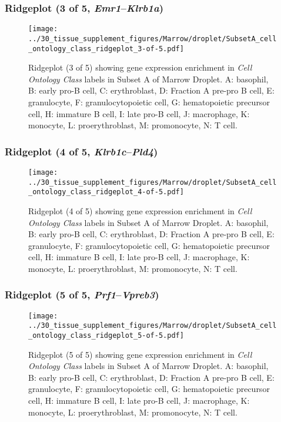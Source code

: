 \clearpage

\subsubsection{Ridgeplot (3 of 5, \emph{Emr1}--\emph{Klrb1a})}
\begin{figure}[h]
\centering
\texttt{[image: ../30\_tissue\_supplement\_figures/Marrow/droplet/SubsetA\_cell\_ontology\_class\_ridgeplot\_3-of-5.pdf]}

\caption{ Ridgeplot (3 of 5)  showing gene expression enrichment in \emph{Cell Ontology Class} labels in Subset A of Marrow Droplet. A: basophil, B: early pro-B cell, C: erythroblast, D: Fraction A pre-pro B cell, E: granulocyte, F: granulocytopoietic cell, G: hematopoietic precursor cell, H: immature B cell, I: late pro-B cell, J: macrophage, K: monocyte, L: proerythroblast, M: promonocyte, N: T cell.}
\end{figure}


\clearpage

\subsubsection{Ridgeplot (4 of 5, \emph{Klrb1c}--\emph{Pld4})}
\begin{figure}[h]
\centering
\texttt{[image: ../30\_tissue\_supplement\_figures/Marrow/droplet/SubsetA\_cell\_ontology\_class\_ridgeplot\_4-of-5.pdf]}

\caption{ Ridgeplot (4 of 5)  showing gene expression enrichment in \emph{Cell Ontology Class} labels in Subset A of Marrow Droplet. A: basophil, B: early pro-B cell, C: erythroblast, D: Fraction A pre-pro B cell, E: granulocyte, F: granulocytopoietic cell, G: hematopoietic precursor cell, H: immature B cell, I: late pro-B cell, J: macrophage, K: monocyte, L: proerythroblast, M: promonocyte, N: T cell.}
\end{figure}


\clearpage

\subsubsection{Ridgeplot (5 of 5, \emph{Prf1}--\emph{Vpreb3})}
\begin{figure}[h]
\centering
\texttt{[image: ../30\_tissue\_supplement\_figures/Marrow/droplet/SubsetA\_cell\_ontology\_class\_ridgeplot\_5-of-5.pdf]}

\caption{ Ridgeplot (5 of 5)  showing gene expression enrichment in \emph{Cell Ontology Class} labels in Subset A of Marrow Droplet. A: basophil, B: early pro-B cell, C: erythroblast, D: Fraction A pre-pro B cell, E: granulocyte, F: granulocytopoietic cell, G: hematopoietic precursor cell, H: immature B cell, I: late pro-B cell, J: macrophage, K: monocyte, L: proerythroblast, M: promonocyte, N: T cell.}
\end{figure}


